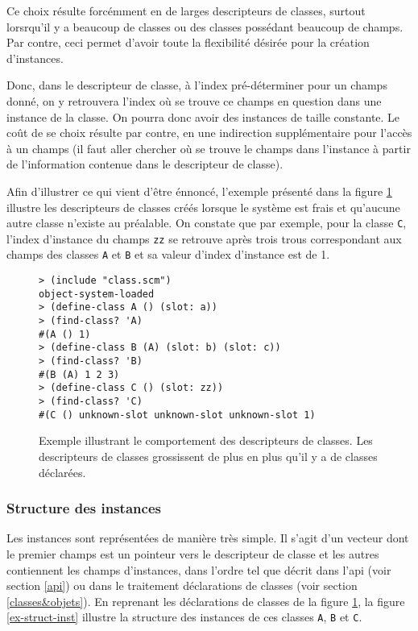       Ce choix résulte forcémment en de larges descripteurs de classes,
      surtout lorsrqu'il y a beaucoup de classes ou des classes
      possédant beaucoup de champs. Par contre, ceci permet d'avoir
      toute la flexibilité désirée pour la création d'instances. 

      Donc, dans le descripteur de classe, à l'index pré-déterminer pour
      un champs donné, on y retrouvera l'index où se trouve ce champs en
      question dans une instance de la classe. On pourra donc avoir des
      instances de taille constante. Le coût de se choix résulte par
      contre, en une indirection supplémentaire pour l'accès à un champs
      (il faut aller chercher où se trouve le champs dans l'instance à
      partir de l'information contenue dans le descripteur de classe).

      Afin d'illustrer ce qui vient d'être énnoncé, l'exemple présenté
      dans la figure \ref{ex-cdesc} illustre les descripteurs de classes
      créés lorsque le système est \og frais \fg et qu'aucune autre
      classe n'existe au préalable. On constate que par exemple, pour la
      classe \texttt{C}, l'index d'instance du champs \texttt{zz} se
      retrouve après trois \og trous \fg correspondant aux champs des
      classes \texttt{A} et \texttt{B} et sa valeur d'index d'instance
      est de 1.

      \begin{figure}[h!]
        \begin{lstlisting}
> (include "class.scm")
object-system-loaded
> (define-class A () (slot: a))
> (find-class? 'A)
#(A () 1)
> (define-class B (A) (slot: b) (slot: c))
> (find-class? 'B)
#(B (A) 1 2 3)
> (define-class C () (slot: zz))
> (find-class? 'C)
#(C () unknown-slot unknown-slot unknown-slot 1)
        \end{lstlisting}
        \caption{Exemple illustrant le comportement des descripteurs de
          classes. Les descripteurs de classes grossissent de plus en
          plus qu'il y a de classes déclarées.}
        \label{ex-cdesc}
      \end{figure}

    \subsubsection{Structure des instances}
      \label{inst-struct}
      Les instances sont représentées de manière très simple. Il
      s'agit d'un vecteur dont le premier champs est un pointeur vers
      le descripteur de classe et les autres contiennent les champs
      d'instances, dans l'ordre tel que décrit dans l'api (voir
      section \ref{api}) ou dans le traitement déclarations de classes
      (voir section \ref{classes&objets}). En reprenant les
      déclarations de classes de la figure \ref{ex-cdesc}, la figure
      \ref{ex-struct-inst} illustre la structure des instances de ces
      classes \texttt{A}, \texttt{B} et \texttt{C}.

